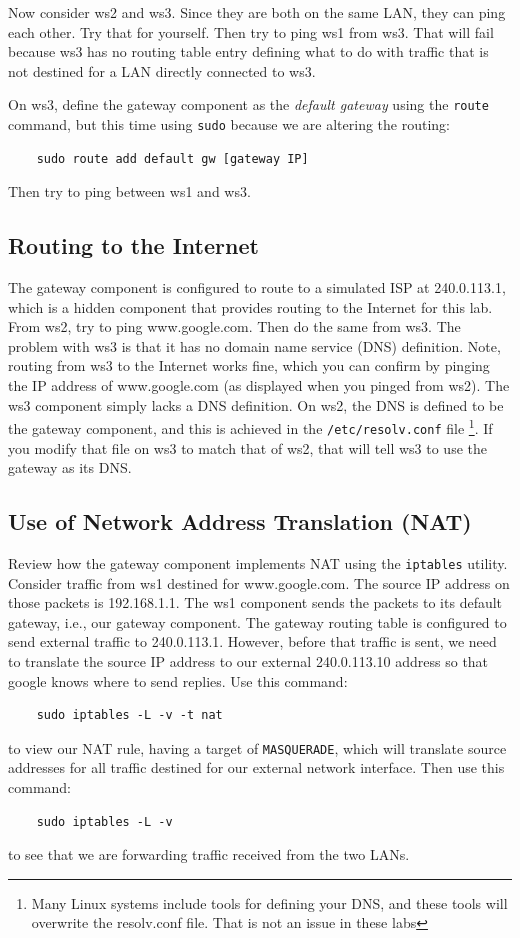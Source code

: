 Now consider ws2 and ws3.  Since they are both on the same LAN, they can ping
each other.  Try that for yourself.  Then try to ping ws1 from ws3.  That will
fail because ws3 has no routing table entry defining what to do with traffic 
that is not destined for a LAN directly connected to ws3.

On ws3, define the gateway component as the \textit{default gateway} using the 
\texttt{route} command, but this time using \texttt{sudo} because we are altering the routing:

\begin{verbatim}
    sudo route add default gw [gateway IP]
\end{verbatim}
\noindent Then try to ping between ws1 and ws3. 

\subsection{Routing to the Internet}
The gateway component is configured to route to a simulated ISP at 240.0.113.1, which 
is a hidden component that provides routing to the Internet for this lab.  From ws2, 
try to ping www.google.com.  Then do the same from ws3.  The problem with ws3 is that
it has no domain name service (DNS) definition.  Note, routing from ws3 to the Internet
works fine, which you can confirm by pinging the IP address of www.google.com (as displayed
when you pinged from ws2).  The ws3 component simply lacks a DNS definition. 
On ws2, the DNS is defined to be the
gateway component, and this is achieved in the \texttt{/etc/resolv.conf} file \footnote{
Many Linux systems include tools for defining your DNS, and these tools will overwrite
the resolv.conf file.  That is not an issue in these labs}.  If you 
modify that file on ws3 to match that of ws2, that will tell ws3 to use the gateway
as its DNS.

\subsection{Use of Network Address Translation (NAT)}
Review how the gateway component implements NAT using the \texttt{iptables} 
utility.  Consider traffic from ws1 destined for www.google.com. The source IP address
on those packets is 192.168.1.1.  The ws1 component sends the packets to its default
gateway, i.e., our gateway component.  The gateway routing table is configured to
send external traffic to 240.0.113.1.  However, before that traffic is sent, we need
to translate the source IP address to our external 240.0.113.10 address so that google knows
where to send replies.  
Use this command:
\begin{verbatim}
    sudo iptables -L -v -t nat
\end{verbatim}
\noindent to view our NAT rule, having a target of \texttt{MASQUERADE}, which will translate
source addresses for all traffic destined for our external network interface.  Then use 
this command:
\begin{verbatim}
    sudo iptables -L -v 
\end{verbatim}
\noindent to see that we are forwarding traffic received from the two LANs. 

